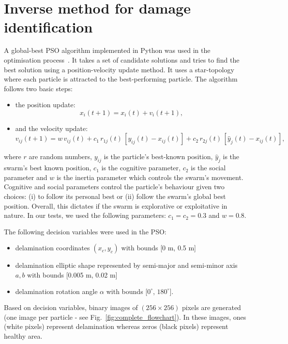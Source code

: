 \section{Inverse method for damage identification}

A global-best PSO algorithm implemented in Python was used in the optimisation process~\cite{MirandaLesterJames}.
It takes a set of candidate solutions and tries to find the best solution using a position-velocity update method. 
It uses a star-topology where each particle is attracted to the best-performing particle.
The algorithm follows two basic steps:
\begin{itemize}
	\item the position update:
	\begin{equation}
		x_i(t+1) = x_i(t) + v_i(t+1),\label{eq:position_update}
	\end{equation}
	\item and the velocity update:
	\begin{equation}
		v_{ij}(t+1) = w\, v_{ij}(t) + c_1\, r_{1j}(t) \,[y_{ij}(t) - x_{ij}(t)] + c_2\, r_{2j}(t)\,[\hat{y}_j(t) - x_{ij}(t)],\label{eq:velocity_update}
	\end{equation}
\end{itemize}
where $r$ are random numbers, $y_{ij}$ is the particle's best-known position, $\hat{y}_j$ is the swarm's best known position, $c_1$ is the cognitive parameter, $c_2$ is the social parameter and $w$ is the inertia parameter which controls the swarm's movement.
Cognitive and social parameters control the particle's behaviour given two choices: (i) to follow its personal best or (ii) follow the swarm’s global best position.
Overall, this dictates if the swarm is explorative or exploitative in nature. 
In our tests, we used the following parameters: $c_1 = c_2 = 0.3$ and $w=0.8$.

The following decision variables were used in the PSO:
\begin{itemize}
	\item delamination coordinates $(x_c, y_c)$ with bounds [0 m, 0.5 m]
	\item delamination elliptic shape represented by semi-major and semi-minor axis $a, b$ with bounds [0.005 m, 0.02 m]
	\item delamination rotation angle $\alpha$ with bounds [$0^\circ$, $180^\circ$].
\end{itemize}

Based on decision variables, binary images of $(256\times256)$ pixels are generated (one image per particle - see Fig.~\ref{fig:complete_flowchart}).
In these images, ones (white pixels) represent delamination whereas zeros (black pixels) represent healthy area.

